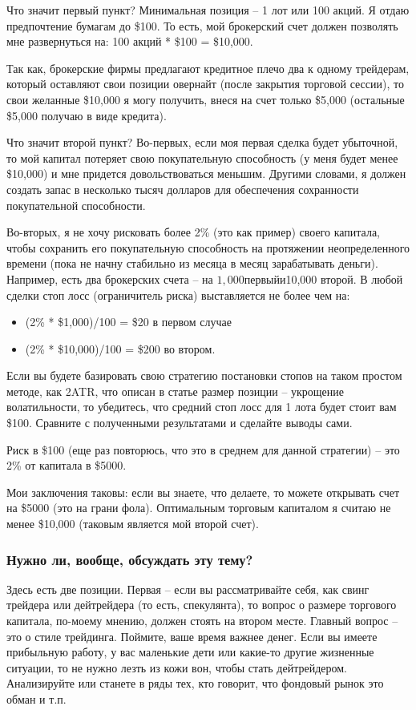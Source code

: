 \documentclass{book}
\begin{document}
Что значит первый пункт? Минимальная позиция – 1 лот или 100 акций. Я отдаю предпочтение бумагам до \$100. То есть, мой брокерский счет должен позволять мне развернуться на: 100 акций * \$100 = \$10,000.

Так как, брокерские фирмы предлагают кредитное плечо два к одному трейдерам, который оставляют свои позиции овернайт (после закрытия торговой сессии), то свои желанные \$10,000 я могу получить, внеся на счет только \$5,000 (остальные \$5,000 получаю в виде кредита).

Что значит второй пункт? Во-первых, если моя первая сделка будет убыточной, то мой капитал потеряет свою покупательную способность (у меня будет менее \$10,000) и мне придется довольствоваться меньшим. Другими словами, я должен создать запас в несколько тысяч долларов для обеспечения сохранности покупательной способности.

Во-вторых, я не хочу рисковать более 2\% (это как пример) своего капитала, чтобы сохранить его покупательную способность на протяжении неопределенного времени (пока не начну стабильно из месяца в месяц зарабатывать деньги). Например, есть два брокерских счета – на $1,000 первый и $10,000 второй. В любой сделки стоп лосс (ограничитель риска) выставляется не более чем на:
\begin{itemize}
\item     (2\% * \$1,000)/100 = \$20 в первом случае
\item     (2\% * \$10,000)/100 = \$200 во втором.
\end{itemize}

Если вы будете базировать свою стратегию постановки стопов на таком простом методе, как 2ATR, что описан в статье размер позиции – укрощение волатильности, то убедитесь, что средний стоп лосс для 1 лота будет стоит вам \$100. Сравните с полученными результатами и сделайте выводы сами.

Риск в \$100 (еще раз повторюсь, что это в среднем для данной стратегии) – это 2\% от капитала в \$5000.

Мои заключения таковы: если вы знаете, что делаете, то можете открывать счет на \$5000 (это на грани фола). Оптимальным торговым капиталом я считаю не менее \$10,000 (таковым является мой второй счет).

\subsubsection{Нужно ли, вообще, обсуждать эту тему?}

Здесь есть две позиции. Первая – если вы рассматривайте себя, как свинг трейдера или дейтрейдера (то есть, спекулянта), то вопрос о размере торгового капитала, по-моему мнению, должен стоять на втором месте. Главный вопрос – это о стиле трейдинга. Поймите, ваше время важнее денег. Если вы имеете прибыльную работу, у вас маленькие дети или какие-то другие жизненные ситуации, то не нужно лезть из кожи вон, чтобы стать дейтрейдером. Анализируйте или станете в ряды тех, кто говорит, что фондовый рынок это обман и т.п.
\end{document}
